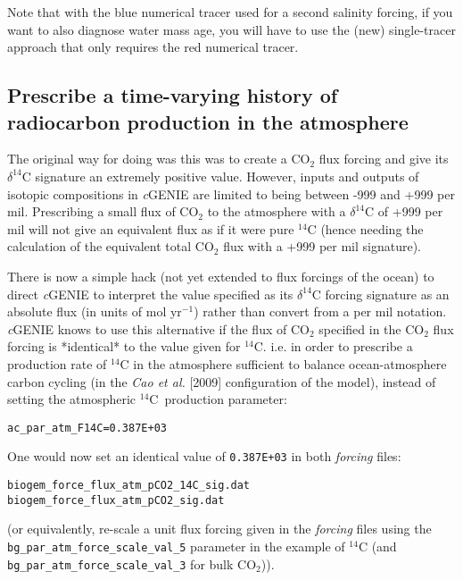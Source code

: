 \documentclass[11pt,fleqn]{book} %
\begin{document}
Note that with the blue numerical tracer used for a second salinity forcing, if you want to also diagnose water mass age, you will have to use the (new) single-tracer approach that only requires the red numerical tracer.

%
\newpage
\subsection*{Prescribe a time-varying history of radiocarbon production in the atmosphere}
\vspace{1mm}

The original way for doing was this was to create a CO\(_{2}\) flux forcing and give its \(\delta^{14}\)C signature an extremely positive value. However, inputs and outputs of isotopic compositions in \textit{c}GENIE are limited to being between -999 and +999 per mil. Prescribing a small flux of CO\(_{2}\) to the atmosphere with a \(\delta^{14}\)C of +999 per mil will not give an equivalent flux as if it were pure \(^{14}\)C (hence needing the calculation of the equivalent total CO\(_{2}\) flux with a +999 per mil signature).

There is now a simple hack (not yet extended to flux forcings of the ocean) to direct \textit{c}GENIE to interpret the value specified as its \(\delta^{14}\)C forcing signature as an absolute flux (in units of mol yr\(^{-1}\)) rather than convert from a per mil notation. \textit{c}GENIE knows to use this alternative if the flux of CO\(_{2}\) specified in the CO\(_{2}\) flux forcing is *identical* to the value given for \(^{14}\)C. i.e. in order to prescribe a production rate of \(^{14}\)C in the atmosphere sufficient to balance ocean-atmosphere carbon cycling (in the \textit{Cao et al.} [2009] configuration of the model), instead of setting the atmospheric \(^{14}\)C\ production parameter:
\vspace{-2mm}\small\begin{verbatim}
ac_par_atm_F14C=0.387E+03 
\end{verbatim}\normalsize\vspace{-2mm}

\noindent One would now set an identical value of \texttt{0.387E+03} in both \textit{forcing} files:
\vspace{-2mm}\small\begin{verbatim}
biogem_force_flux_atm_pCO2_14C_sig.dat
biogem_force_flux_atm_pCO2_sig.dat
\end{verbatim}\normalsize\vspace{-2mm}
(or equivalently, re-scale a unit flux forcing given in the \textit{forcing} files using the \texttt{bg\_par\_atm\_force\_scale\_val\_5} parameter in the example of \(^{14}\)C (and \texttt{bg\_par\_atm\_force\_scale\_val\_3} for bulk CO\(_{2}\))).
\end{document}
